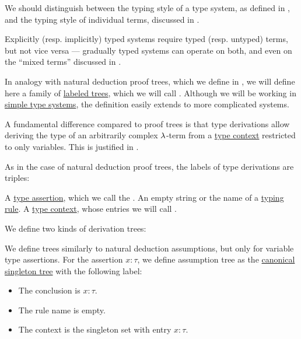 \begin{remark}\label{rem:typing_style_of_terms_vs_systems}
  We should distinguish between the typing style of a type system, as defined in , and the typing style of individual terms, discussed in .

  Explicitly (resp. implicitly) typed systems require typed (resp. untyped) terms, but not vice versa --- gradually typed systems can operate on both, and even on the \enquote{mixed terms} discussed in .
\end{remark}

\begin{definition}\label{def:type_derivation_tree}\mimprovised
  In analogy with natural deduction proof trees, which we define in , we will define here a family of \hyperref[def:labeled_tree]{labeled trees}, which we will call . Although we will be working in \hyperref[def:simple_type_system]{simple type systems}, the definition easily extends to more complicated systems.

  A fundamental difference compared to proof trees is that type derivations allow deriving the type of an arbitrarily complex \( \mathrm{\lambda} \)-term from a \hyperref[def:type_context]{type context} restricted to only variables. This is justified in .

  As in the case of natural deduction proof trees, the labels of type derivations are triples:
  \begin{thmenum}[series=def:type_derivation_tree]
     A \hyperref[def:type_assertion]{type assertion}, which we call the .
     An empty string or the name of a \hyperref[def:simple_typing_rule]{typing rule}.
     A \hyperref[def:type_context]{type context}, whose entries we will call .
  \end{thmenum}

  We define two kinds of derivation trees:
  \begin{thmenum}[resume=def:type_derivation_tree]
     We define  trees similarly to natural deduction assumptions, but only for variable type assertions. For the assertion \( x: \tau \), we define assumption tree as the \hyperref[def:canonical_singleton_tree]{canonical singleton tree} with the following label:
    \begin{itemize}
      \item The conclusion is \( x: \tau \).
      \item The rule name is empty.
      \item The context is the singleton set with entry \( x: \tau \).
    \end{itemize}


\end{thmenum}
\end{definition}
